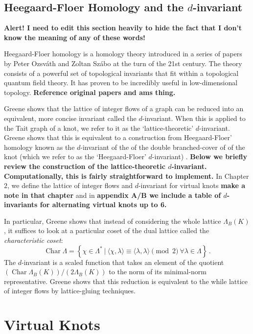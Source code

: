 \documentclass[12pt]{report}
\newcommand{\notered}[1]{{\color{Red} \textbf{#1}}}
\newcommand{\noteblue}[1]{{\color{Blue} \textbf{#1}}}
\begin{document}
\section{Heegaard-Floer Homology and the $d$-invariant}

\notered{Alert! I need to edit this section heavily to hide the fact that I don't know the meaning of any of these words!}

Heegaard-Floer homology is a homology theory introduced in a series of papers by Peter Ozsv\'ath and Zoltan Sz\'abo at the turn of the 21st century. The theory consists of a powerful set of topological invariants that fit within a topological quantum field theory. It has proven to be incredibly useful in low-dimensional topology. \notered{Reference original papers and ams thing.}

Greene shows that the lattice of integer flows of a graph can be reduced into an equivalent, more concise invariant called the $d$-invariant. When this is applied to the Tait graph of a knot, we refer to it as the `lattice-theoretic' $d$-invariant. Greene shows that this is  equivalent to a construction from Heegaard-Floer' homology known as the $d$-invariant of the of the double branched-cover of of the knot (which we refer to as the `Heegaard-Floer' $d$-invariant) \cite{lattices-graphs-mutation}.
\noteblue{Below we briefly review the construction of the lattice-theoretic $d$-invariant. Computationally, this is fairly straightforward to implement.} In Chapter $2$, we define the lattice of integer flows and $d$-invariant for virtual knots \notered{make a note in that chapter} and in \notered{appendix A/B we include a table of $d$-invariants for alternating virtual knots up to 6.} 

In particular, Greene shows that instead of considering the whole lattice $\Lambda_{B}(K)$, it suffices to look at a particular coset of the dual lattice called the \textit{characteristic coset}:
\[\operatorname{Char} \Lambda = \left\{ \chi \in \Lambda^{*} \ \Big|\  \langle\chi,\lambda\rangle \equiv \langle\lambda,\lambda\rangle \pmod 2\  \forall \lambda \in \Lambda \right\}\,.\]
The $d$-invariant is a scaled function that takes an element of the quotient $(\operatorname{Char} \Lambda_{B}(K)) / (2 \Lambda_{B}(K))$ to the norm of its minimal-norm representative. Greene shows that this reduction is equivalent to the while lattice of integer flows by lattice-gluing techniques.


\chapter{Virtual Knots}
\end{document}
